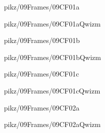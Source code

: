 \documentclass[9pt,xcolor={svgnames, x11names}]{beamer}
\begin{document}
\begin{frame}{pikz/09Frames/09CF01a}
  
\end{frame}


\begin{frame}{pikz/09Frames/09CF01aQwizm}
  
\end{frame}


\begin{frame}{pikz/09Frames/09CF01b}
  
\end{frame}


\begin{frame}{pikz/09Frames/09CF01bQwizm}
  
\end{frame}


\begin{frame}{pikz/09Frames/09CF01c}
  
\end{frame}


\begin{frame}{pikz/09Frames/09CF01cQwizm}
  
\end{frame}


\begin{frame}{pikz/09Frames/09CF02a}
  
\end{frame}


\begin{frame}{pikz/09Frames/09CF02aQwizm}
  
\end{frame}
\end{document}
